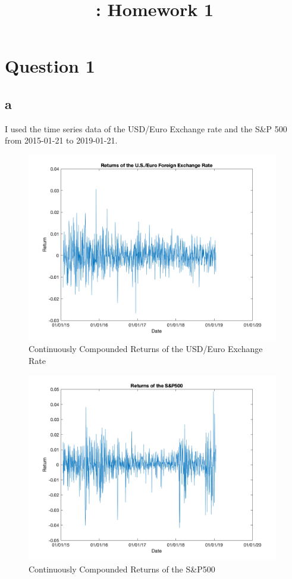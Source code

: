 \documentclass{report}
\title {\LectureTitle : Homework 1}
\begin{document}
	
\maketitle

\section*{Question 1}

\subsection*{a}
I used the time series data of the USD/Euro Exchange rate and the S\&P 500 from 2015-01-21 to 2019-01-21.

\begin{figure}[H]
	\centering
	\includegraphics[width = 11cm]{1a1}
	\caption{Continuously Compounded Returns of the USD/Euro Exchange Rate} 
\end{figure}

\begin{figure}[H]
	\centering
	\includegraphics[width = 11cm]{1a2}
	\caption{Continuously Compounded Returns of the S\&P500} 
\end{figure}
\end{document}
